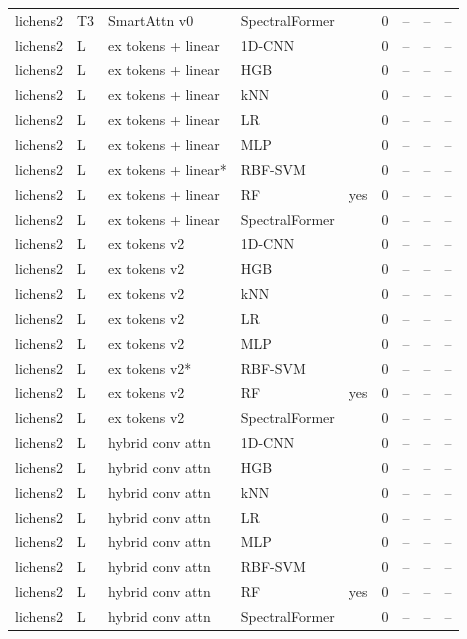 \begin{tabular}{lllllcccc}
lichens2 & T3 & SmartAttn v0 & SpectralFormer &  & 0 & -- & -- & -- \\
lichens2 & L & ex tokens + linear & 1D-CNN &  & 0 & -- & -- & -- \\
lichens2 & L & ex tokens + linear & HGB &  & 0 & -- & -- & -- \\
lichens2 & L & ex tokens + linear & kNN &  & 0 & -- & -- & -- \\
lichens2 & L & ex tokens + linear & LR &  & 0 & -- & -- & -- \\
lichens2 & L & ex tokens + linear & MLP &  & 0 & -- & -- & -- \\
lichens2 & L & ex tokens + linear* & RBF-SVM &  & 0 & -- & -- & -- \\
lichens2 & L & ex tokens + linear & RF & yes & 0 & -- & -- & -- \\
lichens2 & L & ex tokens + linear & SpectralFormer &  & 0 & -- & -- & -- \\
lichens2 & L & ex tokens v2 & 1D-CNN &  & 0 & -- & -- & -- \\
lichens2 & L & ex tokens v2 & HGB &  & 0 & -- & -- & -- \\
lichens2 & L & ex tokens v2 & kNN &  & 0 & -- & -- & -- \\
lichens2 & L & ex tokens v2 & LR &  & 0 & -- & -- & -- \\
lichens2 & L & ex tokens v2 & MLP &  & 0 & -- & -- & -- \\
lichens2 & L & ex tokens v2* & RBF-SVM &  & 0 & -- & -- & -- \\
lichens2 & L & ex tokens v2 & RF & yes & 0 & -- & -- & -- \\
lichens2 & L & ex tokens v2 & SpectralFormer &  & 0 & -- & -- & -- \\
lichens2 & L & hybrid conv attn & 1D-CNN &  & 0 & -- & -- & -- \\
lichens2 & L & hybrid conv attn & HGB &  & 0 & -- & -- & -- \\
lichens2 & L & hybrid conv attn & kNN &  & 0 & -- & -- & -- \\
lichens2 & L & hybrid conv attn & LR &  & 0 & -- & -- & -- \\
lichens2 & L & hybrid conv attn & MLP &  & 0 & -- & -- & -- \\
lichens2 & L & hybrid conv attn & RBF-SVM &  & 0 & -- & -- & -- \\
lichens2 & L & hybrid conv attn & RF & yes & 0 & -- & -- & -- \\
lichens2 & L & hybrid conv attn & SpectralFormer &  & 0 & -- & -- & -- \\

\end{tabular}
